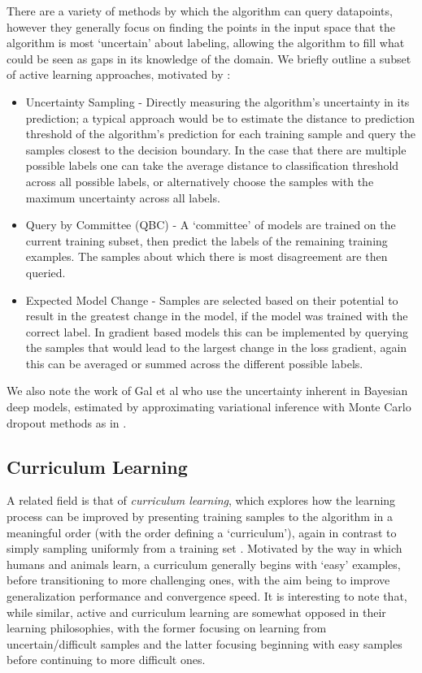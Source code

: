 \documentclass[a4paper,10pt]{article}
\begin{document}
There are a variety of methods by which the algorithm can query datapoints, however they generally focus on finding the points in the input space that the algorithm is most `uncertain' about labeling, allowing the algorithm to fill what could be seen as gaps in its knowledge of the domain. We briefly outline a subset of active learning approaches, motivated by \cite{Settles 2009}:
\begin{itemize}
\item Uncertainty Sampling - Directly measuring the algorithm's uncertainty in its prediction; a typical approach would be to estimate the distance to prediction threshold of the algorithm's prediction for each training sample and query the samples closest to the decision boundary. In the case that there are multiple possible labels one can take the average distance to classification threshold across all possible labels, or alternatively choose the samples with the maximum uncertainty across all labels.
\item Query by Committee (QBC) - A `committee' of models are trained on the current training subset, then predict the labels of the remaining training examples. The samples about which there is most disagreement are then queried.
\item Expected Model Change - Samples are selected based on their potential to result in the greatest change in the model, if the model was trained with the correct label. In gradient based models this can be implemented by querying the samples that would lead to the largest change in the loss gradient, again this can be averaged or summed across the different possible labels. 
\end{itemize}
We also note the work of Gal et al \cite{Gal 2016} who use the uncertainty inherent in Bayesian deep models, estimated by approximating variational inference with Monte Carlo dropout methods as in \cite{Gal 2016 2}.

\subsection*{Curriculum Learning}
A related field is that of \textit{curriculum learning}, which explores how the learning process can be improved by presenting training samples to the algorithm in a meaningful order (with the order defining a `curriculum'), again in contrast to simply sampling uniformly from a training set \cite{Bengio 09}. Motivated by the way in which humans and animals learn, a curriculum generally begins with `easy' examples, before transitioning to more challenging ones, with the aim being to improve generalization performance and convergence speed. It is interesting to note that, while similar, active and curriculum learning are somewhat opposed in their learning philosophies, with the former focusing on learning from uncertain/difficult samples and the latter focusing beginning with easy samples before continuing to more difficult ones. 
\end{document}
